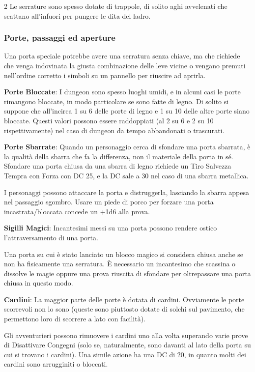 \begin{multicols}{2}
Le serrature sono spesso dotate di trappole, di solito aghi avvelenati che scattano all'infuori per pungere le dita del ladro.

\subsubsection{Porte, passaggi ed aperture}

Una porta speciale potrebbe avere una serratura senza chiave, ma che richiede che venga indovinata la giusta combinazione delle leve vicine o vengano premuti nell'ordine corretto i simboli su un pannello per riuscire ad aprirla.

\textbf{Porte Bloccate}: I dungeon sono spesso luoghi umidi, e in alcuni casi le porte rimangono bloccate, in modo particolare se sono fatte di legno. Di solito si suppone che all'incirca 1 su 6 delle porte di legno e 1 su 10 delle altre porte siano bloccate. Questi valori possono essere raddoppiati (al 2 su 6 e 2 su 10 rispettivamente) nel caso di dungeon da tempo abbandonati o trascurati.

\textbf{Porte Sbarrate}: Quando un personaggio cerca di sfondare una porta sbarrata, è la qualità della sbarra che fa la differenza, non il materiale della porta in sé. Sfondare una porta chiusa da una sbarra di legno richiede un Tiro Salvezza Tempra con Forza con DC 25, e la DC sale a 30 nel caso di una sbarra metallica.

I personaggi possono attaccare la porta e distruggerla, lasciando la sbarra appesa nel passaggio sgombro. Usare un piede di porco per forzare una porta incastrata/bloccata concede un +1d6 alla prova.

\textbf{Sigilli Magici}: Incantesimi messi su una porta possono rendere ostico l'attraversamento di una porta.

Una porta su cui è stato lanciato un blocco magico si considera chiusa anche se non ha fisicamente una serratura. È necessario un incantesimo che scassina o dissolve le magie oppure una prova riuscita di sfondare per oltrepassare una porta chiusa in questo modo.

\textbf{Cardini}: La maggior parte delle porte è dotata di cardini. Ovviamente le porte scorrevoli non lo sono (queste sono piuttosto dotate di solchi sul pavimento, che permettono loro di scorrere a lato con facilità).

Gli avventurieri possono rimuovere i cardini uno alla volta superando varie prove di Disattivare Congegni (solo se, naturalmente, sono davanti al lato della porta su cui si trovano i cardini). Una simile azione ha una DC di 20, in quanto molti dei cardini sono arrugginiti o bloccati.


\end{multicols}
